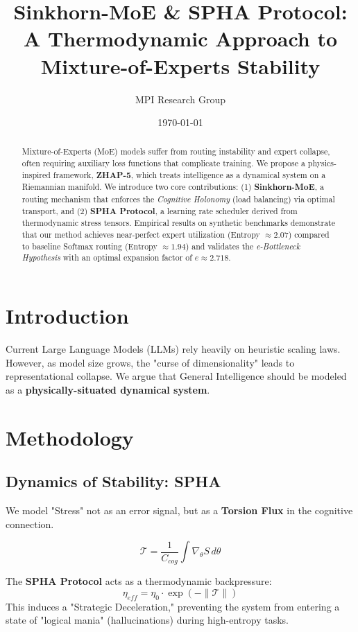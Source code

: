 \documentclass[twocolumn]{article}
\title{Sinkhorn-MoE \& SPHA Protocol: \\ A Thermodynamic Approach to Mixture-of-Experts Stability}
\author{MPI Research Group}
\date{\today}
\newcommand{\stress}{\mathcal{T}}
\newcommand{\capacitance}{C_{cog}}
\begin{document}
\maketitle

\begin{abstract}
Mixture-of-Experts (MoE) models suffer from routing instability and expert collapse, often requiring auxiliary loss functions that complicate training. We propose a physics-inspired framework, \textbf{ZHAP-5}, which treats intelligence as a dynamical system on a Riemannian manifold. We introduce two core contributions: (1) \textbf{Sinkhorn-MoE}, a routing mechanism that enforces the \textit{Cognitive Holonomy} (load balancing) via optimal transport, and (2) \textbf{SPHA Protocol}, a learning rate scheduler derived from thermodynamic stress tensors. Empirical results on synthetic benchmarks demonstrate that our method achieves near-perfect expert utilization (Entropy $\approx 2.07$) compared to baseline Softmax routing (Entropy $\approx 1.94$) and validates the \textit{e-Bottleneck Hypothesis} with an optimal expansion factor of $e \approx 2.718$.
\end{abstract}

\section{Introduction}
Current Large Language Models (LLMs) rely heavily on heuristic scaling laws. However, as model size grows, the "curse of dimensionality" leads to representational collapse. We argue that General Intelligence should be modeled as a \textbf{physically-situated dynamical system}.

\section{Methodology}

\subsection{Dynamics of Stability: SPHA}
We model "Stress" not as an error signal, but as a \textbf{Torsion Flux} in the cognitive connection.

\begin{equation}
\stress = \frac{1}{\capacitance} \int \nabla_{\theta} S \, d\theta
\end{equation}

The \textbf{SPHA Protocol} acts as a thermodynamic backpressure:
\begin{equation}
\eta_{eff} = \eta_0 \cdot \exp(-\|\stress\|)
\end{equation}
This induces a "Strategic Deceleration," preventing the system from entering a state of "logical mania" (hallucinations) during high-entropy tasks.
\end{document}
